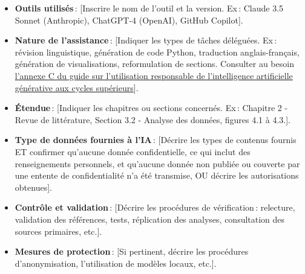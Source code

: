 \begin{itemize}
    \item \textbf{Outils utilisés}\,: [Inscrire le nom de l'outil et la version. Ex\,: Claude 3.5 Sonnet (Anthropic), ChatGPT-4 (OpenAI), GitHub Copilot].
    \item \textbf{Nature de l'assistance}\,: [Indiquer les types de tâches déléguées. Ex\,: révision linguistique, génération de code Python, traduction anglais-français, génération de visualisations, reformulation de sections. Consulter au besoin \href{https://libguides.biblio.usherbrooke.ca/ld.php?content_id=37838948}{l’annexe C du guide sur l’utilisation responsable de l'intelligence artificielle générative aux cycles supérieurs}].
    \item \textbf{Étendue}\,: [Indiquer les chapitres ou sections concernés. Ex\,: Chapitre 2 - Revue de littérature, Section 3.2 - Analyse des données, figures 4.1 à 4.3.].
    \item \textbf{Type de données fournies à l'IA}\,: [Décrire les types de contenus fournis ET confirmer qu'aucune donnée confidentielle, ce qui inclut des renseignements personnels, et qu’aucune donnée non publiée ou couverte par une entente de confidentialité n'a été transmise, OU décrire les autorisations obtenues].
    \item \textbf{Contrôle et validation}\,: [Décrire les procédures de vérification\,: relecture, validation des références, tests, réplication des analyses, consultation des sources primaires, etc.].
    \item \textbf{Mesures de protection}\,: [Si pertinent, décrire les procédures d'anonymisation, l'utilisation de modèles locaux, etc.].
\end{itemize}











